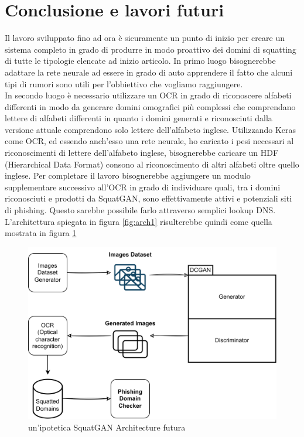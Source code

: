 \chapter*{Conclusione e lavori futuri}
Il lavoro sviluppato fino ad ora è sicuramente un punto di inizio per creare un sistema completo in grado di produrre in modo proattivo dei domini di squatting di tutte le tipologie elencate ad inizio articolo. In primo luogo bisognerebbe adattare la rete neurale ad essere in grado di auto apprendere il fatto che alcuni tipi di rumori sono utili per l'obbiettivo che vogliamo raggiungere.\\
In secondo luogo è necessario utilizzare un OCR in grado di riconoscere alfabeti differenti in modo da generare domini omografici più complessi che comprendano lettere di alfabeti differenti in quanto i domini generati e riconosciuti dalla versione attuale comprendono solo lettere dell'alfabeto inglese. Utilizzando Keras come OCR, ed essendo anch'esso una rete neurale, ho caricato i pesi necessari al riconoscimenti di lettere dell'alfabeto inglese, bisognerebbe caricare un HDF (Hierarchical Data Format) consono al riconoscimento di altri alfabeti oltre quello inglese.
Per completare il lavoro bisognerebbe aggiungere un modulo supplementare successivo all'OCR in grado di individuare quali, tra i domini riconosciuti e prodotti da SquatGAN, sono effettivamente attivi e potenziali siti di phishing. Questo sarebbe possibile farlo attraverso semplici lookup DNS.
L'architettura spiegata in figura \ref{fig:arch1} risulterebbe quindi come quella mostrata in figura \ref{fig:arch2}
\begin{figure}[!h]
  \centering
  \begin{minipage}[b]{0.6\textwidth}
    \includegraphics[width=\textwidth]{pictures/arch2.png}
    \caption{un'ipotetica SquatGAN Architecture futura}
    \label{fig:arch2}
  \end{minipage}
  \hfill
\end{figure}\\
